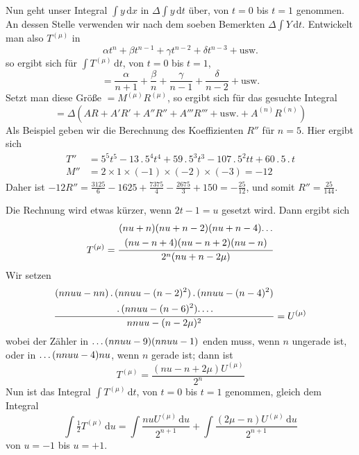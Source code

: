 Nun geht unser Integral $\int y\,\mathrm{d}x$ in $\Delta\int y\,\mathrm{d}t$ über, von $t=0$ bis $t=1$ genommen. An dessen Stelle verwenden wir nach dem soeben Bemerkten $\Delta\int Y\,\mathrm{d}t$. Entwickelt man also $T^{(\mu)}$ in
\[
\alpha t^n+\beta t^{n-1}+\gamma t^{n-2}+\delta t^{n-3}+\text{usw.}
\]
so ergibt sich für $\int T^{(\mu)}\,\mathrm{d}t$, von $t=0$ bis $t=1$,
\[
=\frac{\alpha}{n+1}+\frac{\beta}{n}+\frac{\gamma}{n-1}+\frac{\delta}{n-2}+\text{usw.}
\]
Setzt man diese Größe $=M^{(\mu)}R^{(\mu)}$, so ergibt sich für das gesuchte Integral
\[
=\Delta(AR+A'R'+A''R''+A'''R'''+\text{usw.}+A^{(n)}R^{(n)})
\]
Als Beispiel geben wir die Berechnung des Koeffizienten $R''$ für $n=5$. Hier ergibt sich
\[
\begin{aligned}
T''&=5^5t^5-13\, .\,5^4t^4+59\, .\,5^3t^3-107\, .\,5^2tt+60\, .\,5\, .\,t\\[5pt]
M''&=2\times1\times(-1)\times(-2)\times(-3)=-12
\end{aligned}
\]
Daher ist $-12R''=\allowbreak \frac{3125}{6}-1625+\allowbreak \frac{7375}{4}-\frac{2675}{3}+\allowbreak 150=\allowbreak -\frac{25}{12}$, und somit $R''=\frac{25}{144}$.

Die Rechnung wird etwas kürzer, wenn $2t-1=u$ gesetzt wird. Dann ergibt sich
\[
T^{(\mu)}=\frac{\begin{gathered}(nu+n)(nu+n-2)(nu+n-4)\ldotp\ldotp\ldotp\\(nu-n+4)(nu-n+2)(nu-n)\end{gathered}}{2^n(nu+n-2\mu)}
\]
Wir setzen
\[
\frac{\begin{gathered}(nnuu-nn)\, .\,(nnuu-(n-2)^2)\, .\,(nnuu-(n-4)^2)\\\, .\,(nnuu-(n-6)^2)\ldotp\ldotp\ldotp\ldotp\end{gathered}}{nnuu-(n-2\mu)^2}=U^{(\mu)}
\]
wobei der Zähler in $\ldotp\ldotp\ldotp(nnuu-9)(nnuu-1)$ enden muss, wenn $n$ ungerade ist, oder in $\ldotp\ldotp\ldotp(nnuu-4)nu$, wenn $n$ gerade ist; dann ist
\[
T^{(\mu)}=\frac{(nu-n+2\mu)U^{(\mu)}}{2^n}
\]
Nun ist das Integral $\int T^{(\mu)}\,\mathrm{d}t$, von $t=0$ bis $t=1$ genommen, gleich dem Integral
\[
\int\tfrac12 T^{(\mu)}\,\mathrm{d}u=\int\frac{nuU^{(\mu)}\,\mathrm{d}u}{2^{n+1}}+\int\frac{(2\mu-n)U^{(\mu)}\,\mathrm{d}u}{2^{n+1}}
\]
von $u=-1$ bis $u=+1$.

